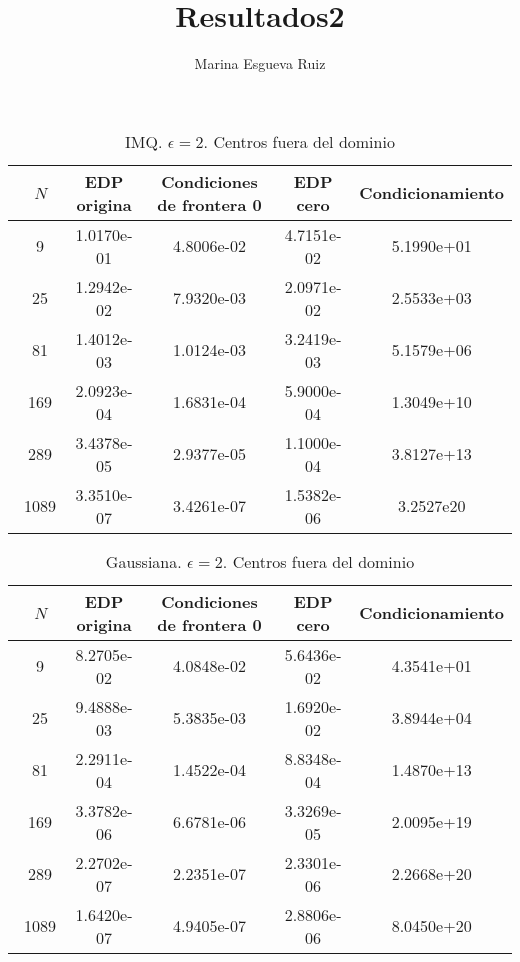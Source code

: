 \documentclass[11pt,a4paper]{article}
\author{Marina Esgueva Ruiz}
\title{Resultados2}
\begin{document}
\begin{table}
\begin{center}
\caption{IMQ. $\epsilon=2$. Centros fuera del dominio}
\begin{tabular}{|c|c|c|c|c|}
\hline
\ $N$ & EDP origina & Condiciones de frontera 0 & EDP cero & Condicionamiento\\
\hline
\ 9 & 1.0170e-01 & 4.8006e-02 & 4.7151e-02&5.1990e+01 \\
\ 25 & 1.2942e-02 & 7.9320e-03 & 2.0971e-02&2.5533e+03 \\
\ 81 & 1.4012e-03 & 1.0124e-03& 3.2419e-03&5.1579e+06 \\
\ 169 & 2.0923e-04 & 1.6831e-04&5.9000e-04&1.3049e+10\\
\ 289 & 3.4378e-05&2.9377e-05&1.1000e-04&3.8127e+13\\
\ 1089 & 3.3510e-07&3.4261e-07&1.5382e-06&3.2527e20\\
\hline  

\end{tabular}
\end{center}
\end{table}

\begin{table}
\begin{center}
\caption{Gaussiana. $\epsilon=2$. Centros fuera del dominio}
\begin{tabular}{|c|c|c|c|c|}
\hline
\ $N$ & EDP origina & Condiciones de frontera 0 & EDP cero & Condicionamiento\\
\hline
\ 9 & 8.2705e-02 & 4.0848e-02 &  5.6436e-02& 4.3541e+01 \\
\ 25 &  9.4888e-03 &5.3835e-03  & 1.6920e-02 &3.8944e+04\\
\ 81 &2.2911e-04  &1.4522e-04 &8.8348e-04 &1.4870e+13\\
\ 169 &3.3782e-06 &6.6781e-06 & 3.3269e-05& 2.0095e+19\\
\ 289 &2.2702e-07 &2.2351e-07&2.3301e-06&2.2668e+20\\
\ 1089 &1.6420e-07 &4.9405e-07&2.8806e-06& 8.0450e+20\\
\hline  

\end{tabular}
\end{center}
\end{table}
\end{document}

